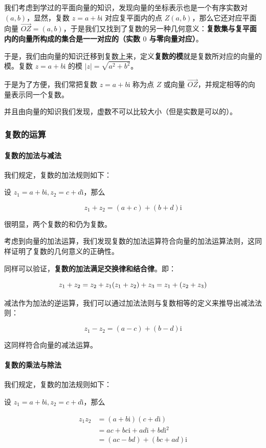 我们考虑到学过的平面向量的知识，发现向量的坐标表示也是一个有序实数对 $(a,b)$，显然，复数 $z=a+b\text{i}$ 对应复平面内的点 $Z(a,b)$，那么它还对应平面向量 $\overrightarrow{OZ}=(a,b)$，于是我们又找到了复数的另一种几何意义：\textbf{复数集与复平面内的向量所构成的集合是一一对应的（实数 $0$ 与零向量对应）}。

于是，我们由向量的知识迁移到复数上来，定义\textbf{复数的模}就是复数所对应的向量的模。复数 $z=a+b\text{i}$ 的模 $|z|=\sqrt{a^2+b^2}$。

于是为了方便，我们常把复数 $z=a+b\text{i}$ 称为点 $Z$ 或向量 $\overrightarrow {OZ}$，并规定相等的向量表示同一个复数。

并且由向量的知识我们发现，虚数不可以比较大小（但是实数是可以的）。

\subsubsection{复数的运算}

\paragraph{复数的加法与减法}

我们规定，复数的加法规则如下：

设 $z_1=a+b\text{i},z_2=c+d\text{i}$，那么

$$
z_1+z_2=(a+c)+(b+d)\text{i}
$$

很明显，两个复数的和仍为复数。

考虑到向量的加法运算，我们发现复数的加法运算符合向量的加法运算法则，这同样证明了复数的几何意义的正确性。

同样可以验证，\textbf{复数的加法满足交换律和结合律}。即：

$$
z_1+z_2=z_2+z_1\\
(z_1+z_2)+z_3=z_1+(z_2+z_3)
$$

减法作为加法的逆运算，我们可以通过加法法则与复数相等的定义来推导出减法法则：

$$
z_1-z_2=(a-c)+(b-d)\text{i}
$$

这同样符合向量的减法运算。

\paragraph{复数的乘法与除法}

我们规定，复数的加法规则如下：

设 $z_1=a+b\text{i},z_2=c+d\text{i}$，那么

$$
\begin{aligned}
z_1z_2&=(a+b\text{i})(c+d\text{i})\\
&=ac+bc\text{i}+ad\text{i}+bd\text{i}^2\\
&=(ac-bd)+(bc+ad)\text{i}
\end{aligned}
$$

